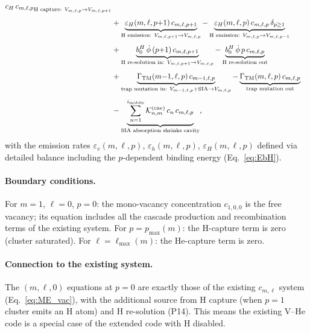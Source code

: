 \documentclass[pdflatex,sn-basic]{sn-jnl} %
\begin{document}
\begin{equation}
{\begin{split}
{       c_H\,c_{m,\ell,p}
       }_{\text{H capture: }V_{m,\ell,p}\to V_{m,\ell,p+1}}
    \\[4pt]
    &+ \underbrace{
       \varepsilon_H(m,\ell,p{+}1)\,c_{m,\ell,p+1}
       }_{\text{H emission: }V_{m,\ell,p+1}\to V_{m,\ell,p}}
     - \underbrace{
       \varepsilon_H(m,\ell,p)\,c_{m,\ell,p}\,\delta_{p\geq 1}
       }_{\text{H emission: }V_{m,\ell,p}\to V_{m,\ell,p-1}}
    \\[4pt]
    &+ \underbrace{
       b_0^H\,\dot{\phi}\,(p{+}1)\,c_{m,\ell,p+1}
       }_{\text{H re-solution in: }V_{m,\ell,p+1}\to V_{m,\ell,p}}
     - \underbrace{
       b_0^H\,\dot{\phi}\,p\,c_{m,\ell,p}
       }_{\text{H re-solution out}}
    \\[4pt]
    &+ \underbrace{
       \Gamma_{\mathrm{TM}}(m{-}1,\ell,p)\,c_{m-1,\ell,p}
       }_{\text{trap mutation in: }V_{m-1,\ell,p}+\text{SIA}\to V_{m,\ell,p}}
     - \underbrace{
       \Gamma_{\mathrm{TM}}(m,\ell,p)\,c_{m,\ell,p}
       }_{\text{trap mutation out}}
    \\[4pt]
    &- \underbrace{
       \sum_{n=1}^{i_{\rm mobile}}
       \mathcal{K}_{n,m}^{(\mathrm{cav})}\,c_n\,c_{m,\ell,p}
       }_{\text{SIA absorption shrinks cavity}},
\end{split}
}
\end{equation}
with the emission rates $\varepsilon_v(m,\ell,p)$,
$\varepsilon_h(m,\ell,p)$, $\varepsilon_H(m,\ell,p)$ defined via
detailed balance including the $p$-dependent binding energy
(Eq.~\ref{eq:EbH}).

\paragraph{Boundary conditions.}
For $m = 1$, $\ell = 0$, $p = 0$: the mono-vacancy concentration
$c_{1,0,0}$ is the free vacancy; its equation includes all the
cascade production and recombination terms of the existing system.
For $p = p_{\max}(m)$: the H-capture term is zero (cluster saturated).
For $\ell = \ell_{\max}(m)$: the He-capture term is zero.

\paragraph{Connection to the existing system.}
The $(m,\ell,0)$ equations at $p=0$ are exactly those of the existing
$c_{m,\ell}$ system (Eq.~\ref{eq:ME_vac}), with the additional source
from H capture (when $p=1$ cluster emits an H atom) and H re-solution
(P14). This means the existing V--He code is a special case of the
extended code with H disabled.
\end{document}
